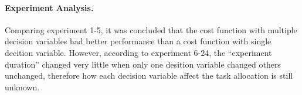 \paragraph{Experiment Analysis.} 
Comparing experiment 1-5, it was concluded that the cost function with multiple decision variables had better performance than a cost function with single decition variable. However, according to experiment 6-24, the ``experiment duration'' changed very little when only one desition variable changed others unchanged, therefore how each decision variable affect the task allocation is still unknown.

\begin{table}[htb]
\centering
{}
\caption{Runing execute task with single decision variable and multiple decision variables}
\label{tab:exp_decision_variables}
\end{table}

